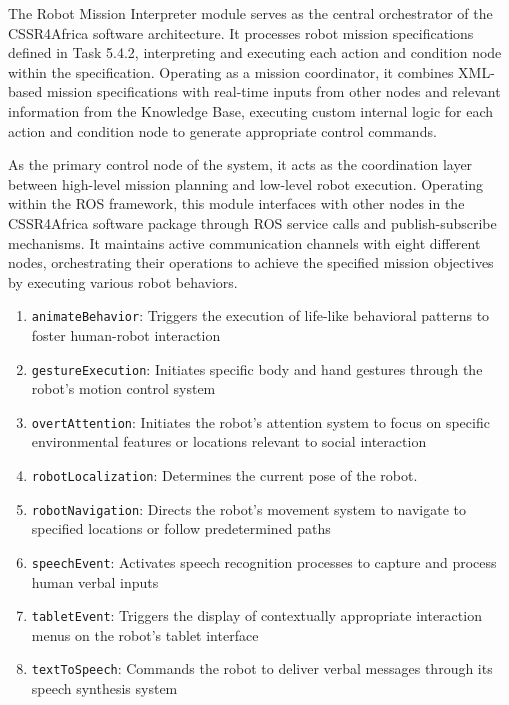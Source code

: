 \documentclass{CSSRforAfrica}
\begin{document}
The Robot Mission Interpreter module serves as the central orchestrator of the CSSR4Africa software architecture. It processes robot mission specifications defined in Task 5.4.2, interpreting and executing each action and condition node within the specification. Operating as a mission coordinator, it combines XML-based mission specifications with real-time inputs from other nodes and relevant information from the Knowledge Base, executing custom internal logic for each action and condition node to generate appropriate control commands.

As the primary control node of the system, it acts as the coordination layer between high-level mission planning and low-level robot execution.
Operating within the ROS framework, this module interfaces with other nodes in the CSSR4Africa software package through ROS service calls and publish-subscribe mechanisms. 
It maintains active communication channels with eight different nodes, orchestrating their operations to achieve the specified mission objectives by executing various robot behaviors.
\begin{enumerate}
    \item \texttt{\small animateBehavior}: Triggers the execution of life-like behavioral patterns to foster human-robot interaction
    \item \texttt{\small gestureExecution}: Initiates specific body and hand gestures through the robot's motion control system
    \item \texttt{\small overtAttention}: Initiates the robot's attention system to focus on specific environmental features or locations relevant to social interaction
    \item \texttt{\small robotLocalization}: Determines the current pose of the robot.
    \item \texttt{\small robotNavigation}: Directs the robot's movement system to navigate to specified locations or follow predetermined paths
    \item \texttt{\small speechEvent}: Activates speech recognition processes to capture and process human verbal inputs
    \item \texttt{\small tabletEvent}: Triggers the display of contextually appropriate interaction menus on the robot's tablet interface
    \item \texttt{\small textToSpeech}: Commands the robot to deliver verbal messages through its speech synthesis system
\end{enumerate}
\end{document}
